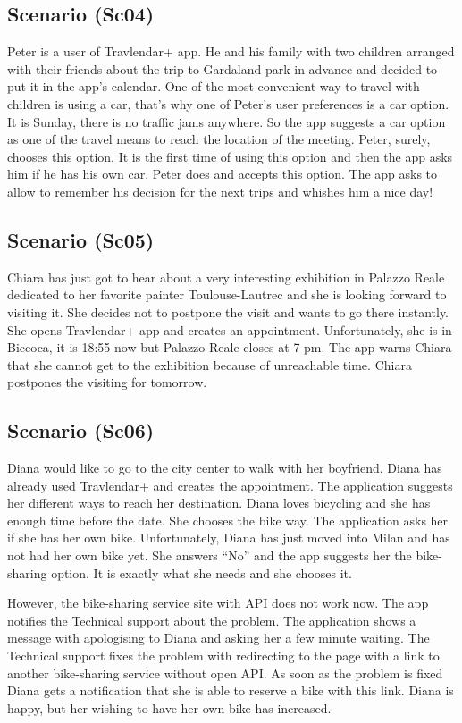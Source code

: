 \documentclass[a4paper,leqno]{book}
\begin{document}
\subsection{Scenario (Sc04)}
Peter is a user of Travlendar+ app. He and his family with two children arranged with their friends about the trip to Gardaland park in advance and decided to put it in the app’s calendar. One of the most convenient way to travel with children is using a car, that’s why one of Peter’s user preferences is a car option. It is Sunday, there is no traffic jams anywhere. So the app suggests a car option as one of the travel means to reach the location of the meeting. Peter, surely, chooses this option. It is the first time of using this option and then the app asks him if he has his own car. Peter does and accepts this option. The app asks to allow to remember his decision for the next trips and whishes him a nice day!

\subsection{Scenario (Sc05)}
Chiara has just got to hear about a very interesting exhibition in Palazzo Reale dedicated to her favorite painter Toulouse-Lautrec and she is looking forward to visiting it. She decides not to postpone the visit and wants to go there instantly. She opens Travlendar+ app and creates an appointment. Unfortunately, she is in Biccoca, it is 18:55 now but Palazzo Reale closes at 7 pm.   The app warns Chiara that she cannot get to the exhibition because of unreachable time. Chiara postpones the visiting for tomorrow.

\subsection{Scenario (Sc06)}
Diana would like to go to the city center to walk with her boyfriend. Diana has already used Travlendar+ and creates the appointment. The application suggests her different ways to reach her destination. Diana loves bicycling and she has enough time before the date. She chooses the bike way. The application asks her if she has her own bike. Unfortunately, Diana has just moved into Milan and has not had her own bike yet. She answers “No” and the app suggests her the bike-sharing option. It is exactly what she needs and she chooses it. 

However, the bike-sharing service site with API does not work now. The app notifies the Technical support about the problem. The application shows a message with apologising to Diana and asking her a few minute waiting. The Technical support fixes the problem with redirecting to the page with a link to another bike-sharing service without open API.  As soon as the problem is fixed Diana gets a notification that she is able to reserve a bike with this link. Diana is happy, but her wishing to have her own bike has increased.
\end{document}
